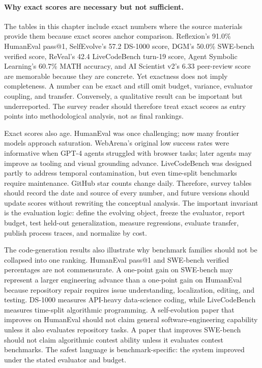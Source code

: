\paragraph{Why exact scores are necessary but not sufficient.}
The tables in this chapter include exact numbers where the source materials provide them because exact scores anchor comparison. Reflexion's 91.0\% HumanEval pass@1, SelfEvolve's 57.2 DS-1000 score, DGM's 50.0\% SWE-bench verified score, ReVeal's 42.4 LiveCodeBench turn-19 score, Agent Symbolic Learning's 60.7\% MATH accuracy, and AI Scientist v2's 6.33 peer-review score are memorable because they are concrete. Yet exactness does not imply completeness. A number can be exact and still omit budget, variance, evaluator coupling, and transfer. Conversely, a qualitative result can be important but underreported. The survey reader should therefore treat exact scores as entry points into methodological analysis, not as final rankings.

Exact scores also age. HumanEval was once challenging; now many frontier models approach saturation. WebArena's original low success rates were informative when GPT-4 agents struggled with browser tasks; later agents may improve as tooling and visual grounding advance. LiveCodeBench was designed partly to address temporal contamination, but even time-split benchmarks require maintenance. GitHub star counts change daily. Therefore, survey tables should record the date and source of every number, and future versions should update scores without rewriting the conceptual analysis. The important invariant is the evaluation logic: define the evolving object, freeze the evaluator, report budget, test held-out generalization, measure regressions, evaluate transfer, publish process traces, and normalize by cost.

The code-generation results also illustrate why benchmark families should not be collapsed into one ranking. HumanEval pass@1 and SWE-bench verified percentages are not commensurate. A one-point gain on SWE-bench may represent a larger engineering advance than a one-point gain on HumanEval because repository repair requires issue understanding, localization, editing, and testing. DS-1000 measures API-heavy data-science coding, while LiveCodeBench measures time-split algorithmic programming. A self-evolution paper that improves on HumanEval should not claim general software-engineering capability unless it also evaluates repository tasks. A paper that improves SWE-bench should not claim algorithmic contest ability unless it evaluates contest benchmarks. The safest language is benchmark-specific: the system improved under the stated evaluator and budget.

